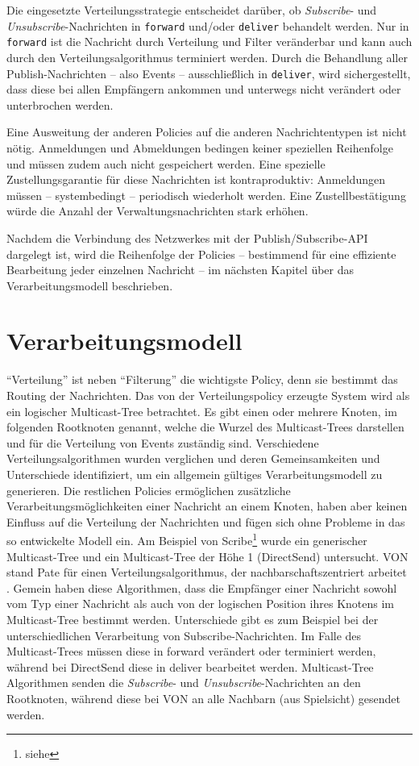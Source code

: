 Die eingesetzte Verteilungsstrategie entscheidet darüber, ob \emph{Subscribe}- und \emph{Unsubscribe}-Nachrichten in \texttt{forward} und/oder \texttt{deliver} behandelt werden. Nur in \texttt{forward} ist die Nachricht durch Verteilung und Filter veränderbar und kann auch durch den Verteilungsalgorithmus terminiert werden. Durch die Behandlung aller Publish-Nachrichten -- also Events -- ausschließlich in \texttt{deliver}, wird sichergestellt, dass diese bei allen Empfängern ankommen und unterwegs nicht verändert oder unterbrochen werden.

Eine Ausweitung der anderen Policies auf die anderen Nachrichtentypen ist nicht nötig. Anmeldungen und Abmeldungen bedingen keiner speziellen Reihenfolge und müssen zudem auch nicht gespeichert werden. Eine spezielle Zustellungsgarantie für diese Nachrichten ist kontraproduktiv:  Anmeldungen müssen -- systembedingt -- periodisch wiederholt werden. Eine Zustellbestätigung würde die Anzahl der Verwaltungsnachrichten stark erhöhen.

Nachdem die Verbindung des Netzwerkes mit der Publish/Subscribe-API dargelegt ist, wird die Reihenfolge der Policies -- bestimmend für eine effiziente Bearbeitung jeder einzelnen Nachricht -- im nächsten Kapitel über das Verarbeitungsmodell beschrieben.

\section{Verarbeitungsmodell}
\enquote{Verteilung} ist neben \enquote{Filterung} die wichtigste Policy, denn sie bestimmt das Routing der Nachrichten. Das von der Verteilungspolicy erzeugte System wird als ein logischer Multicast-Tree betrachtet. Es gibt einen oder mehrere Knoten, im folgenden Rootknoten genannt, welche die Wurzel des Multicast-Trees darstellen und für die Verteilung von Events zuständig sind. Verschiedene Verteilungsalgorithmen wurden verglichen und deren Gemeinsamkeiten und Unterschiede identifiziert, um ein allgemein gültiges Verarbeitungsmodell zu generieren. Die restlichen Policies ermöglichen zusätzliche Verarbeitungsmöglichkeiten einer Nachricht an einem Knoten, haben aber keinen Einfluss auf die Verteilung der Nachrichten und fügen sich ohne Probleme in das so entwickelte Modell ein. Am Beispiel von Scribe\footnote{siehe } wurde ein generischer Multicast-Tree und ein Multicast-Tree der Höhe 1 (DirectSend) untersucht. VON stand Pate für einen Verteilungsalgorithmus, der nachbarschaftszentriert arbeitet \cite{Hu2006VON}. Gemein haben diese Algorithmen, dass die Empfänger einer Nachricht sowohl vom Typ einer Nachricht als auch von der logischen Position ihres Knotens im Multicast-Tree bestimmt werden. Unterschiede gibt es zum Beispiel bei der unterschiedlichen Verarbeitung von Subscribe-Nachrichten. Im Falle des Multicast-Trees müssen diese in forward verändert oder terminiert werden, während bei DirectSend diese in deliver bearbeitet werden. Multicast-Tree Algorithmen senden die \emph{Subscribe}- und \emph{Unsubscribe}-Nachrichten an den Rootknoten, während diese bei VON an alle Nachbarn (aus Spielsicht) gesendet werden.

